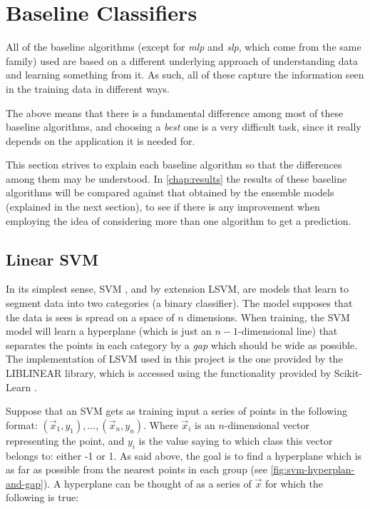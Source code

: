 \documentclass[epsfig,a4paper,11pt,titlepage,twoside,openany]{book}
\begin{document}
\section{Baseline Classifiers}
\label{sec:baseline-classifiers}

All of the baseline algorithms (except for \textit{mlp} and \textit{slp}, which come from the same family) used are based on a different underlying approach of understanding data and learning something from it. As such, all of these capture the information seen in the training data in different ways. 

The above means that there is a fundamental difference among most of these baseline algorithms, and choosing a \textit{best} one is a very difficult task, since it really depends on the application it is needed for. 

This section strives to explain each baseline algorithm so that the differences among them may be understood. In \autoref{chap:results} the results of these baseline algorithms will be compared against that obtained by the ensemble models (explained in the next section), to see if there is any improvement when employing the idea of considering more than one algorithm to get a prediction. 


\subsection{Linear SVM}
\label{sec:clf-lsvm}

In its simplest sense, SVM \cite{Vapnik1995_svm, Cristianini2000_svm}, and by extension LSVM, are models that learn to segment data into two categories (a binary classifier). The model supposes that the data is sees is spread on a space of $n$ dimensions. When training, the SVM model will learn a hyperplane (which is just an $n-1$-dimensional line) that separates the points in each category by a \textit{gap} which should be wide as possible. The implementation of LSVM used in this project is the one provided by the LIBLINEAR \cite{Fan:2008_liblinear} library, which is accessed using the functionality provided by Scikit-Learn \cite{scikit-learn}. 

Suppose that an SVM gets as training input a series of points in the following format: $(\vec{x}_1, y_1), ..., (\vec{x}_n, y_n)$. Where $\vec{x}_i$ is an  $n$-dimensional vector representing the point, and $y_i$ is the value saying to which class this vector belongs to: either -1 or 1. As said above, the goal is to find a hyperplane which is as far as possible from the nearest points in each group (see \autoref{fig:svm-hyperplan-and-gap}). A hyperplane can be thought of as a series of $\vec{x}$ for which the following is true:
\end{document}
